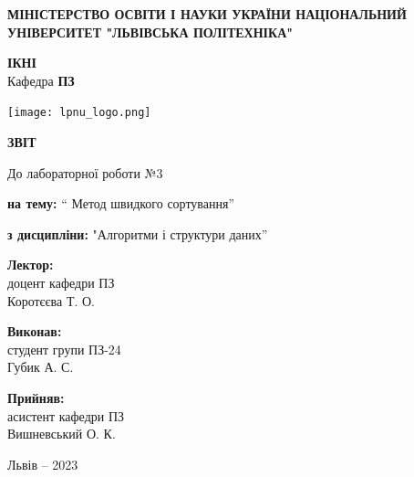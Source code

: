 \documentclass[12pt]{extarticle}
\begin{document}
\begin{titlepage}
    \begin{center}
        \textbf{\normalsize{\MakeUppercase{
            Міністерство Освіти і науки України
            Національний університет "Львівська політехніка"
        }}}

        \begin{flushright}
        \textbf{ІКНІ}\\
        Кафедра \textbf{ПЗ}
        \end{flushright}
        \vspace{15mm}

        \texttt{[image: lpnu\_logo.png]}

        \vspace*{\fill}

        \textbf{\normalsize{\MakeUppercase{Звіт}}}
            
        До лабораторної роботи №3

        \textbf{на тему:} “ Метод швидкого сортування”

        \textbf{з дисципліни:} "Алгоритми і структури даних”
            
        \vspace*{\fill}

        \begin{flushright}

            \textbf{Лектор:}\\
            доцент кафедри ПЗ\\
            Коротєєва Т. О.\\
            \vspace{12pt}

            \textbf{Виконав:}\\
            студент групи ПЗ-24\\
            Губик А. С.\\
            \vspace{12pt}

            \textbf{Прийняв:}\\
            асистент кафедри ПЗ\\
            Вишневський О. К.\\
        \vspace{12pt}
        \end{flushright}

        Львів -- 2023
            
            
    \end{center}
\end{titlepage}
\end{document}
